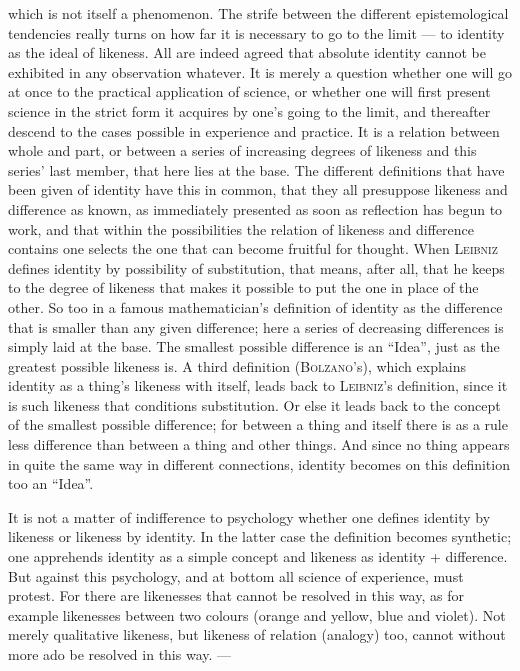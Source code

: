 \documentclass[12pt]{book}
\newcommand{\opage}[1]{\marginnote{\footnotesize\textit{[#1]}}}
\begin{document}
which is not itself a phenomenon. The strife between the different
epistemological tendencies really turns on how far it is necessary to go to the
limit --- to identity as the ideal of likeness. All are indeed agreed that
absolute identity cannot be exhibited in any observation whatever. It is merely
a question whether one will go at once to the practical application of science,
or whether one will first present science in the strict form it acquires by
one's going to the limit, and thereafter descend to the cases possible in
experience and practice. It is a relation between whole and part, or between a
series of increasing degrees of likeness and this series' last member, that here
lies at the base. The different definitions that have been given of identity
have this in common, that they all presuppose likeness and difference as known,
as immediately presented as soon as reflection has begun to work, and that
within the possibilities the relation of likeness and difference contains one
selects the one that can become fruitful for thought. When \textsc{Leibniz}
defines identity by possibility of substitution, that means, after all, that he
keeps to the degree of likeness that makes it possible to put the one in place
of \opage{17}the other. So too in a famous mathematician's definition of identity as the
difference that is smaller than any given difference; here a series of
decreasing differences is simply laid at the base. The smallest possible
difference is an ``Idea'', just as the greatest possible likeness is. A third
definition (\textsc{Bolzano}'s), which explains identity as a thing's likeness
with itself, leads back to \textsc{Leibniz}'s definition, since it is such
likeness that conditions substitution. Or else it leads back to the concept of
the smallest possible difference; for between a thing and itself there is as a
rule less difference than between a thing and other things. And since no thing
appears in quite the same way in different connections, identity becomes on this
definition too an ``Idea''.

It is not a matter of indifference to psychology whether one defines identity by
likeness or likeness by identity. In the latter case the definition becomes
synthetic; one apprehends identity as a simple concept and likeness as identity
+ difference. But against this psychology, and at bottom all science of
experience, must protest. For there are likenesses that cannot be resolved in
this way, as for example likenesses between two colours (orange and yellow, blue
and violet). Not merely qualitative likeness, but likeness of relation (analogy)
too, cannot without more ado be resolved in this way. ---
\end{document}
